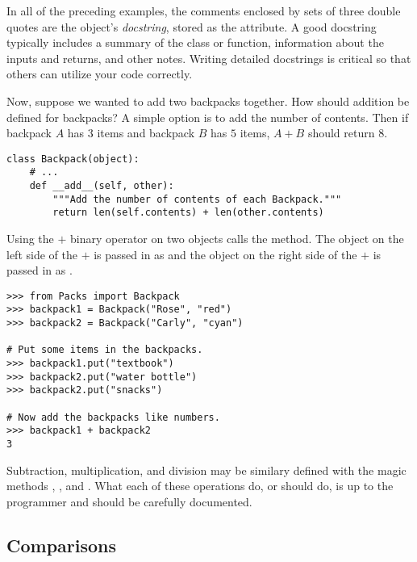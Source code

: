 \begin{info}
In all of the preceding examples, the comments enclosed by sets of three double quotes are the object's \emph{docstring}, stored as the  attribute.
A good docstring typically includes a summary of the class or function, information about the inputs and returns, and other notes.
Writing detailed docstrings is critical so that others can utilize your code correctly.
\end{info}

Now, suppose we wanted to add two backpacks together.
How should addition be defined for backpacks?
A simple option is to add the number of contents.
Then if backpack $A$ has $3$ items and backpack $B$ has $5$ items, $A + B$ should return $8$.

\begin{lstlisting}
class Backpack(object):
    # ...
    def __add__(self, other):
        """Add the number of contents of each Backpack."""
        return len(self.contents) + len(other.contents)
\end{lstlisting}

Using the $+$ binary operator on two  objects calls the  method.
The object on the left side of the $+$ is passed in as  and the object on the right side of the $+$ is passed in as .

\begin{lstlisting}
>>> from Packs import Backpack
>>> backpack1 = Backpack("Rose", "red")
>>> backpack2 = Backpack("Carly", "cyan")

# Put some items in the backpacks.
>>> backpack1.put("textbook")
>>> backpack2.put("water bottle")
>>> backpack2.put("snacks")

# Now add the backpacks like numbers.
>>> backpack1 + backpack2
3
\end{lstlisting}

Subtraction, multiplication, and division may be similary defined with the magic methods , , and .
What each of these operations do, or should do, is up to the programmer and should be carefully documented.

\subsection*{Comparisons}

